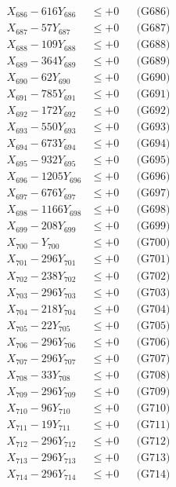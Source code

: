 \documentclass[a4paper,10pt]{article}
\begin{document}
{\begin{align}
X_{686} - 616Y_{686} &\leq +0 && \text{(G686)} \\
X_{687} - 57Y_{687} &\leq +0 && \text{(G687)} \\
X_{688} - 109Y_{688} &\leq +0 && \text{(G688)} \\
X_{689} - 364Y_{689} &\leq +0 && \text{(G689)} \\
X_{690} - 62Y_{690} &\leq +0 && \text{(G690)} \\
\allowbreak
X_{691} - 785Y_{691} &\leq +0 && \text{(G691)} \\
X_{692} - 172Y_{692} &\leq +0 && \text{(G692)} \\
X_{693} - 550Y_{693} &\leq +0 && \text{(G693)} \\
X_{694} - 673Y_{694} &\leq +0 && \text{(G694)} \\
X_{695} - 932Y_{695} &\leq +0 && \text{(G695)} \\
X_{696} - 1205Y_{696} &\leq +0 && \text{(G696)} \\
X_{697} - 676Y_{697} &\leq +0 && \text{(G697)} \\
X_{698} - 1166Y_{698} &\leq +0 && \text{(G698)} \\
X_{699} - 208Y_{699} &\leq +0 && \text{(G699)} \\
X_{700} - Y_{700} &\leq +0 && \text{(G700)} \\
\allowbreak
X_{701} - 296Y_{701} &\leq +0 && \text{(G701)} \\
X_{702} - 238Y_{702} &\leq +0 && \text{(G702)} \\
X_{703} - 296Y_{703} &\leq +0 && \text{(G703)} \\
X_{704} - 218Y_{704} &\leq +0 && \text{(G704)} \\
X_{705} - 22Y_{705} &\leq +0 && \text{(G705)} \\
X_{706} - 296Y_{706} &\leq +0 && \text{(G706)} \\
X_{707} - 296Y_{707} &\leq +0 && \text{(G707)} \\
X_{708} - 33Y_{708} &\leq +0 && \text{(G708)} \\
X_{709} - 296Y_{709} &\leq +0 && \text{(G709)} \\
X_{710} - 96Y_{710} &\leq +0 && \text{(G710)} \\
\allowbreak
X_{711} - 19Y_{711} &\leq +0 && \text{(G711)} \\
X_{712} - 296Y_{712} &\leq +0 && \text{(G712)} \\
X_{713} - 296Y_{713} &\leq +0 && \text{(G713)} \\
X_{714} - 296Y_{714} &\leq +0 && \text{(G714)} \\

\end{align}}
\end{document}
